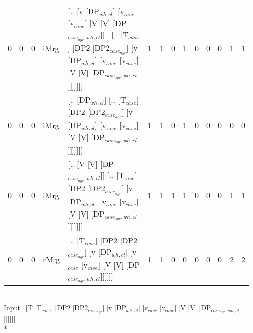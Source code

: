 \begin{tabularx}{\linewidth}{rrrlXrrrrrrrrr}
   0 &       0 &   0 & iMrg & [.. [v [DP$_{wh,cl}$] [v$_{case}$ [v$_{case}$] [V [V] [DP$_{case_{agr},wh,cl}$]]]] [.. [T$_{case}$] [DP2 [DP2$_{case_{agr}}$] [v [DP$_{wh,cl}$] [v$_{case}$ [v$_{case}$] [V [V] [DP$_{case_{agr},wh,cl}$]]]]]]]                      &             1 &             1 &                  0 &            1 &              0 &            0 &              0 &        1 &        1 \\
   0 &       0 &   0 & iMrg & [.. [DP$_{wh,cl}$] [.. [T$_{case}$] [DP2 [DP2$_{case_{agr}}$] [v [DP$_{wh,cl}$] [v$_{case}$ [v$_{case}$] [V [V] [DP$_{case_{agr},wh,cl}$]]]]]]]                                                                        &             1 &             1 &                  0 &            1 &              0 &            0 &              0 &        0 &        0 \\
   0 &       0 &   0 & iMrg & [.. [V [V] [DP$_{case_{agr},wh,cl}$]] [.. [T$_{case}$] [DP2 [DP2$_{case_{agr}}$] [v [DP$_{wh,cl}$] [v$_{case}$ [v$_{case}$] [V [V] [DP$_{case_{agr},wh,cl}$]]]]]]]                                                       &             1 &             1 &                  1 &            1 &              0 &            0 &              0 &        1 &        1 \\
   0 &       0 &   0 & rMrg & [.. [T$_{case}$] [DP2 [DP2$_{case_{agr}}$] [v [DP$_{wh,cl}$] [v$_{case}$ [v$_{case}$] [V [V] [DP$_{case_{agr},wh,cl}$]]]]]]                                                                                        &             1 &             1 &                  0 &            0 &              0 &            0 &              0 &        2 &        2 \\
\hline
\end{tabularx}\endgroup\\
\begingroup\scriptsize Input=[T [T$_{case}$] [DP2 [DP2$_{case_{agr}}$] [v [DP$_{wh,cl}$] [v$_{case}$ [v$_{case}$] [V [V] [DP$_{case_{agr},wh,cl}$]]]]]]\\*
